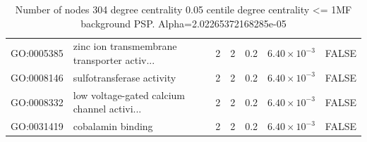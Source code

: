 \begin{table}[ht]
\begin{adjustbox}{max width=\textwidth}
\begin{tabular}{llrrrrl}
  GO:0005385 & zinc ion transmembrane transporter activ... & 2 & 2 & 0.2 & $6.40 \times 10^{-3}$ & FALSE \\ 
  GO:0008146 & sulfotransferase activity & 2 & 2 & 0.2 & $6.40 \times 10^{-3}$ & FALSE \\ 
  GO:0008332 & low voltage-gated calcium channel activi... & 2 & 2 & 0.2 & $6.40 \times 10^{-3}$ & FALSE \\ 
  GO:0031419 & cobalamin binding & 2 & 2 & 0.2 & $6.40 \times 10^{-3}$ & FALSE \\ 
   \hline
\end{tabular}
\end{adjustbox}
\caption{Number of nodes 304 degree centrality 0.05 centile  degree centrality <= 1MF background PSP. Alpha=2.02265372168285e-05} 
\label{tab:Number of nodes 304 degree centrality 0.05 centile  degree centrality <= 1MF background PSP. Alpha=2.02265372168285e-05}
\end{table}


